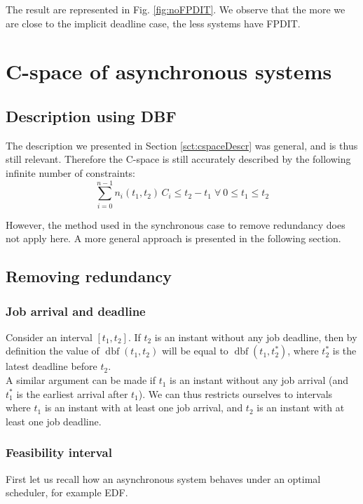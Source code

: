 \documentclass[times, 10pt,twocolumn, a4paper]{article}
\newcommand{\dbf}[1]{\operatorname{dbf}(#1)}
\begin{document}
	The result are represented in Fig. \ref{fig:noFPDIT}. We observe that the more we are close to the implicit deadline case, the less systems have FPDIT.

\section{C-space of asynchronous systems}
  \label{sct:asyncCspace}

  \subsection{Description using DBF}

  The description we presented in Section \ref{sct:cspaceDescr} was general, and is thus still relevant. Therefore the C-space is still accurately described by the following infinite number of constraints:$$\sum_{i=0}^{n-1} n_i(t_1, t_2) \, C_i \leq t_2 - t_1 \; \forall \: 0 \leq t_1 \leq t_2$$

  However, the method used in the synchronous case to remove redundancy does not apply here. A more general approach is presented in the following section.

  \subsection{Removing redundancy}

\subsubsection{Job arrival and deadline}

Consider an interval $[t_1, t_2]$. If $t_2$ is an instant without any job deadline, then by definition the value of $\dbf{t_1, t_2}$ will be equal to $\dbf{t_1, t_2^*}$, where $t_2^*$ is the latest deadline before $t_2$.\\

A similar argument can be made if $t_1$ is an instant without any job arrival (and $t_1^*$ is the earliest arrival after $t_1$). We can thus restricts ourselves to intervals where $t_1$ is an instant with at least one job arrival, and $t_2$ is an instant with at least one job deadline.

  \subsubsection{Feasibility interval}

  First let us recall how an asynchronous system behaves under an optimal scheduler, for example EDF.\\
\end{document}
